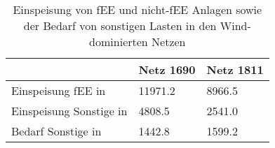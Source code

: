 {
\renewcommand{\arraystretch}{1.2}%
\begin{table}[H]
	\begin{center}
		\caption{Einspeisung von fEE und nicht-fEE Anlagen sowie der Bedarf von sonstigen Lasten in den Wind-dominierten Netzen}
		\begin{tabu} to 0.7\textwidth {X[2] X[1, r] X[1, r]}
			\toprule
											  & Netz \num{1690} & Netz \num{1811} \\ \midrule
			Einspeisung fEE in \si{\mwh}      & \num{11971.2}   & \num{8966.5}    \\
			Einspeisung Sonstige in \si{\mwh} & \num{4808.5}    & \num{2541.0}    \\
			Bedarf Sonstige  in \si{\mwh}     & \num{1442.8}    & \num{1599.2}    \\ \bottomrule
		\end{tabu}
		\label{tab:wind_dominated_week_a_char}
	\end{center}
	\vspace{-3mm}%
\end{table}
}